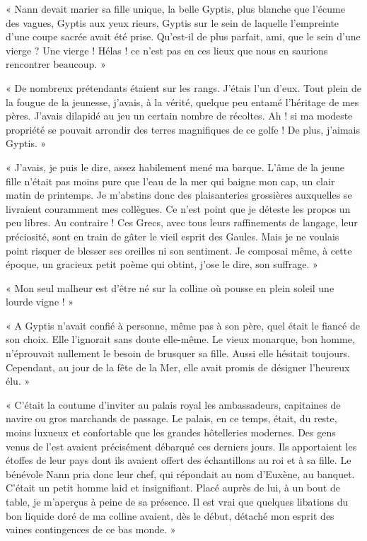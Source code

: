 \documentclass[a4paper, 11pt, oneside, polutonikogreek, french]{article}
\begin{document}
« Nann devait marier sa fille unique, la belle Gyptis, plus blanche que l'écume des vagues, Gyptis aux yeux rieurs, Gyptis sur le sein de laquelle l'empreinte d'une coupe sacrée avait été prise. Qu'est-il de plus parfait, ami, que le sein d'une vierge ? Une vierge ! Hélas ! ce n'est pas en ces lieux que nous en saurions rencontrer beaucoup. »

« De nombreux prétendants étaient sur les rangs. J'étais l'un d'eux. Tout plein de la fougue de la jeunesse, j'avais, à la vérité, quelque peu entamé l'héritage de mes pères. J'avais dilapidé au jeu un certain nombre de récoltes. Ah ! si ma modeste propriété se pouvait arrondir des terres magnifiques de ce golfe ! De plus, j'aimais Gyptis. »

« J'avais, je puis le dire, assez habilement mené ma barque. L'âme de la jeune fille n'était pas moins pure que l'eau de la mer qui baigne mon cap, un clair matin de printemps. Je m'abstins donc des plaisanteries grossières auxquelles se livraient couramment mes collègues. Ce n'est point que je déteste les propos un peu libres. Au contraire ! Ces Grecs, avec tous leurs raffinements de langage, leur préciosité, sont en train de gâter le vieil esprit des Gaules. Mais je ne voulais point risquer de blesser ses oreilles ni son sentiment. Je composai même, à cette époque, un gracieux petit poème qui obtint, j'ose le dire, son suffrage. »

« Mon seul malheur est d'être né sur la colline où pousse en plein soleil une lourde vigne ! »

« A Gyptis n'avait confié à personne, même pas à son père, quel était le fiancé de son choix. Elle l'ignorait sans doute elle-même. Le vieux monarque, bon homme, n'éprouvait nullement le besoin de brusquer sa fille. Aussi elle hésitait toujours. Cependant, au jour de la fête de la Mer, elle avait promis de désigner l'heureux élu. »

« C'était la coutume d'inviter au palais royal les ambassadeurs, capitaines de navire ou gros marchands de passage. Le palais, en ce temps, était, du reste, moins luxueux et confortable que les grandes hôtelleries modernes. Des gens venus de l'est avaient précisément débarqué ces derniers jours. Ils apportaient les étoffes de leur pays dont ils avaient offert des échantillons au roi et à sa fille. Le bénévole Nann pria donc leur chef, qui répondait au nom d'Euxène, au banquet. C'était un petit homme laid et insignifiant. Placé auprès de lui, à un bout de table, je m'aperçus à peine de sa présence. Il est vrai que quelques libations du bon liquide doré de ma colline avaient, dès le début, détaché mon esprit des vaines contingences de ce bas monde. »
\end{document}

